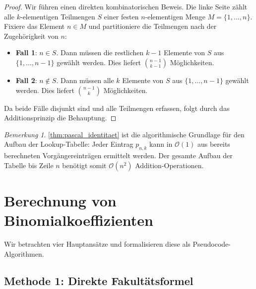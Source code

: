 ﻿\documentclass[12pt, a4paper]{article}
\newcommand{\Oh}{\mathcal{O}}
\theoremstyle{plain}
\theoremstyle{definition}
\theoremstyle{remark}
\newtheorem{bemerkung}[theorem]{Bemerkung}
\renewcommand{\Oh}{\mathcal{O}}
\begin{document}
\begin{proof}
  Wir führen einen direkten kombinatorischen Beweis. Die linke Seite
  zählt alle $k$-elementigen Teilmengen $S$ einer festen
  $n$-elementigen Menge $M = \{1, \ldots, n\}$. Fixiere das Element
  $n \in M$ und partitioniere die Teilmengen nach der Zugehörigkeit
  von $n$:
  \begin{itemize}
    \item \textbf{Fall 1}: $n \in S$. Dann müssen die restlichen
          $k-1$ Elemente von $S$ aus $\{1,\ldots,n-1\}$ gewählt werden.
          Dies liefert $\binom{n-1}{k-1}$ Möglichkeiten.
    \item \textbf{Fall 2}: $n \notin S$. Dann müssen alle $k$ Elemente
          von $S$ aus $\{1,\ldots,n-1\}$ gewählt werden. Dies liefert
          $\binom{n-1}{k}$ Möglichkeiten.
  \end{itemize}
  Da beide Fälle disjunkt sind und alle Teilmengen erfassen, folgt
  durch das Additionsprinzip die Behauptung.
\end{proof}

\begin{bemerkung}
  \cref{thm:pascal_identitaet} ist die algorithmische Grundlage für
  den Aufbau der Lookup-Tabelle: Jeder Eintrag $p_{n,k}$ kann in
  $\Oh(1)$ aus bereits berechneten Vorgängereinträgen ermittelt
  werden. Der gesamte Aufbau der Tabelle bis Zeile $n$ benötigt
  somit $\Oh(n^2)$ Addition-Operationen.
\end{bemerkung}


\section{Berechnung von Binomialkoeffizienten}
\label{sec:algorithmen}

Wir betrachten vier Hauptansätze und formalisieren diese als
Pseudocode-Algorithmen.

\subsection{Methode 1: Direkte Fakultätsformel}
\label{subsec:algo_fakultaet}
\end{document}
